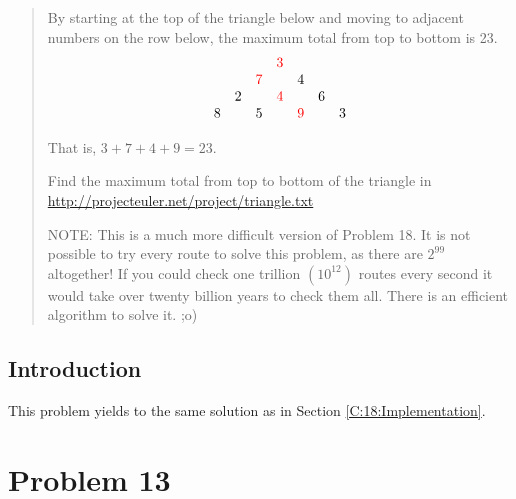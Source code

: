 \documentclass[oneside,12pt]{book}   	%
\newcounter{ex}
\newcounter{pr}
\theoremstyle{definition}
\begin{document}
\begin{spacing}{1.618}
		\begin{quote}
			By starting at the top of the triangle below and moving to adjacent numbers on the row below, the maximum total from top to bottom is 23.
			\begin{alignat}{4}
				\begin{array}{ccccccc}
					&&&\textcolor{red}{3}&&& \\
					&&\textcolor{red}{7}&& 4&& \\
					&2&&\textcolor{red}{4}&& 6& \\
					8 && 5 && \textcolor{red}{9} && 3
				\end{array} \label{E:67:1}
			\end{alignat}

			That is, $3 + 7 + 4 + 9 = 23$.

			Find the maximum total from top to bottom of the triangle in \url{http://projecteuler.net/project/triangle.txt}

			NOTE: This is a much more difficult version of Problem 18. It is not possible to try every route to solve this problem, as there are $2^99$ altogether! If you could check one trillion $\left(10^12\right)$ routes every second it would take over twenty billion years to check them all. There is an efficient algorithm to solve it. ;o)
		\end{quote}

		\section{Introduction}
		
			This problem yields to the same solution as in Section \ref{C:18:Implementation}. 

\appendix

	\chapter{Problem 13}\label{A:P:13}
	

\end{spacing}
\end{document}
